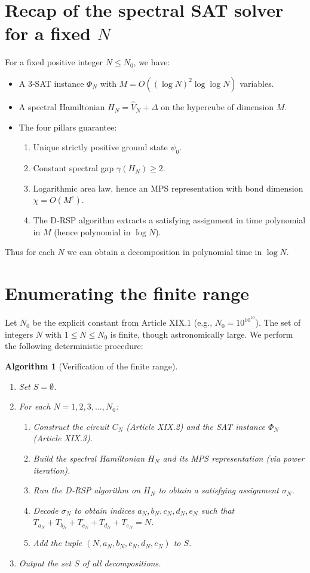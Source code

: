 \documentclass[11pt,a4paper]{article}
\newtheorem{algorithm}{Algorithm}[section]
\begin{document}
\section{Recap of the spectral SAT solver for a fixed \(N\)}

For a fixed positive integer \(N\le N_0\), we have:
\begin{itemize}
\item A 3‑SAT instance \(\Phi_N\) with \(M = O((\log N)^2 \log \log N)\) variables.
\item A spectral Hamiltonian \(H_N = \hat{V}_N + \Delta\) on the hypercube of dimension \(M\).
\item The four pillars guarantee:
  \begin{enumerate}
  \item Unique strictly positive ground state \(\psi_0\).
  \item Constant spectral gap \(\gamma(H_N) \ge 2\).
  \item Logarithmic area law, hence an MPS representation with bond dimension \(\chi = O(M^c)\).
  \item The D‑RSP algorithm extracts a satisfying assignment in time polynomial in \(M\) (hence polynomial in \(\log N\)).
  \end{enumerate}
\end{itemize}
Thus for each \(N\) we can obtain a decomposition in polynomial time in \(\log N\).

\section{Enumerating the finite range}

Let \(N_0\) be the explicit constant from Article XIX.1 (e.g., \(N_0 = 10^{10^{10}}\)). The set of integers \(N\) with \(1\le N\le N_0\) is finite, though astronomically large. We perform the following deterministic procedure:

\begin{algorithm}[Verification of the finite range]\label{alg:range}
\begin{enumerate}
\item Set \(S = \emptyset\).
\item For each \(N = 1,2,3,\dots, N_0\):
   \begin{enumerate}
   \item Construct the circuit \(C_N\) (Article XIX.2) and the SAT instance \(\Phi_N\) (Article XIX.3).
   \item Build the spectral Hamiltonian \(H_N\) and its MPS representation (via power iteration).
   \item Run the D‑RSP algorithm on \(H_N\) to obtain a satisfying assignment \(\sigma_N\).
   \item Decode \(\sigma_N\) to obtain indices \(a_N,b_N,c_N,d_N,e_N\) such that \(T_{a_N}+T_{b_N}+T_{c_N}+T_{d_N}+T_{e_N}=N\).
   \item Add the tuple \((N, a_N,b_N,c_N,d_N,e_N)\) to \(S\).
   \end{enumerate}
\item Output the set \(S\) of all decompositions.
\end{enumerate}
\end{algorithm}
\end{document}

